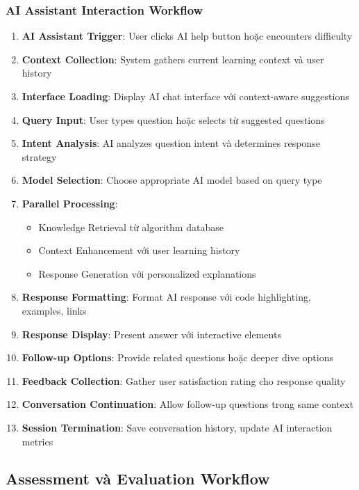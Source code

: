 \subsubsection{AI Assistant Interaction Workflow}

\begin{enumerate}
    \item \textbf{AI Assistant Trigger}: User clicks AI help button hoặc encounters difficulty
    \item \textbf{Context Collection}: System gathers current learning context và user history
    \item \textbf{Interface Loading}: Display AI chat interface với context-aware suggestions
    \item \textbf{Query Input}: User types question hoặc selects từ suggested questions
    \item \textbf{Intent Analysis}: AI analyzes question intent và determines response strategy
    \item \textbf{Model Selection}: Choose appropriate AI model based on query type
    \item \textbf{Parallel Processing}: 
    \begin{itemize}
        \item Knowledge Retrieval từ algorithm database
        \item Context Enhancement với user learning history
        \item Response Generation với personalized explanations
    \end{itemize}
    \item \textbf{Response Formatting}: Format AI response với code highlighting, examples, links
    \item \textbf{Response Display}: Present answer với interactive elements
    \item \textbf{Follow-up Options}: Provide related questions hoặc deeper dive options
    \item \textbf{Feedback Collection}: Gather user satisfaction rating cho response quality
    \item \textbf{Conversation Continuation}: Allow follow-up questions trong same context
    \item \textbf{Session Termination}: Save conversation history, update AI interaction metrics
\end{enumerate}

\subsection{Assessment và Evaluation Workflow}
\label{subsec:assessment-workflow}

